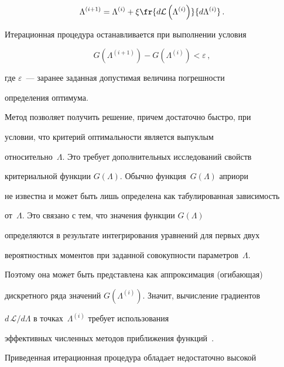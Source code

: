      \begin{equation}

     \Lambda^{(i+1)} =\Lambda^{(i)}+\xi

\fr{d\mathcal{L}\left(\Lambda^{(i)}\right)}{d\Lambda^{(i)}}\,.

     \label{e18-sin}

     \end{equation}



     Итерационная процедура останавливается при выполнении условия

     \begin{equation}

     G\left(\Lambda^{(i+1)}\right) -G\left(\Lambda^{(i)}\right)< \varepsilon\,,

     \label{e19-sin}

     \end{equation}

где $\varepsilon$~--- заранее заданная допустимая величина погрешности

определения оптимума.



     Метод позволяет получить решение, причем достаточно быстро, при

условии, что критерий оптимальности является выпуклым

относительно~$\Lambda$. Это требует дополнительных исследований свойств

критериальной функции $G(\Lambda)$. Обычно функция~$G(\Lambda)$ априори

не известна и может быть лишь определена как табулированная зависимость

от~$\Lambda$. Это связано с тем, что значения функции $G(\Lambda)$

определяются в результате интегрирования уравнений для первых двух

вероятностных моментов при заданной совокупности параметров~$\Lambda$.

Поэтому она может быть представлена как аппроксимация (огибающая)

дискретного ряда значений $G(\Lambda^{(i)})$. Значит, вычисление градиентов

$d\,\mathcal{L}/d\Lambda$ в точках~$\Lambda^{(i)}$ требует использования

эффективных численных методов приближения функций~\cite{23-sin}.

Приведенная итерационная процедура обладает недостаточно высокой

